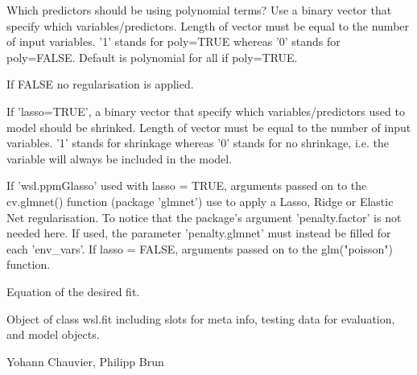 \documentclass[a4paper]{book}
\begin{document}
\begin{Arguments}
\begin{ldescription}
\item[\code{which\_poly}] Which predictors should be using polynomial terms? Use a binary vector that
specify which variables/predictors. Length of vector must be equal to the number of input variables.
'1' stands for poly=TRUE whereas '0' stands for poly=FALSE. Default is polynomial for all if poly=TRUE.

\item[\code{lasso}] If FALSE no regularisation is applied.

\item[\code{penalty.glmnet}] If 'lasso=TRUE', a binary vector that specify which variables/predictors
used to model should be shrinked. Length of vector must be equal to the number of input
variables. '1' stands for shrinkage whereas '0' stands for no shrinkage, i.e. the variable
will always be included in the model.

\item[\code{...}] If 'wsl.ppmGlasso' used with lasso = TRUE, arguments passed on to the
cv.glmnet() function (package 'glmnet') use to apply a Lasso, Ridge or Elastic Net
regularisation. To notice that the package's argument 'penalty.factor' is not needed
here. If used, the parameter 'penalty.glmnet' must instead be filled for each 'env\_vars'.
If lasso = FALSE, arguments passed on to the glm("poisson") function.

\item[\code{formula}] Equation of the desired fit.
\end{ldescription}
\end{Arguments}
%
\begin{Value}
Object of class wsl.fit including slots for meta info, testing data for
evaluation, and model objects.
\end{Value}
%
\begin{Author}\relax
Yohann Chauvier, Philipp Brun
\end{Author}
%
\end{document}
